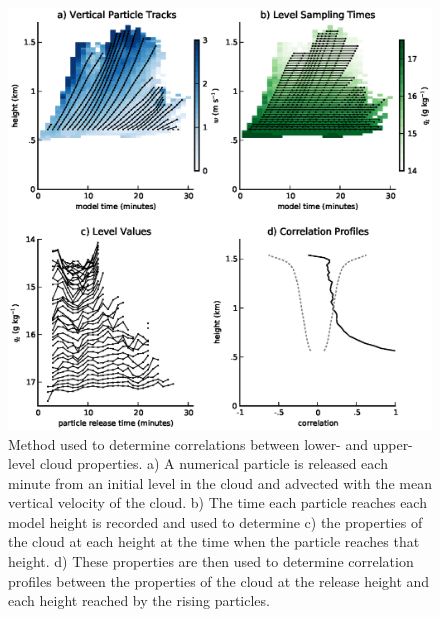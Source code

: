 \documentclass[acp]{copernicus}
\begin{document}
\begin{figure}[t]
\vspace*{2mm}
\begin{center}
\includegraphics[width=\textwidth]{./figures/cloud_base_schematic}
\end{center}
\caption{Method used to determine correlations between lower- and upper-level 
cloud properties. a) A numerical particle is released each minute from an 
initial level in the cloud and advected with the mean vertical velocity of the 
cloud. b) The time each particle reaches each model height is recorded and used 
to determine c) the properties of the cloud at each height at the time when the 
particle reaches that height.  d) These properties are then used to determine 
correlation profiles between the properties of the cloud at the release height 
and each height reached by the rising particles.}
\label{fig:cloud_base_schematic}
\end{figure}
\end{document}
